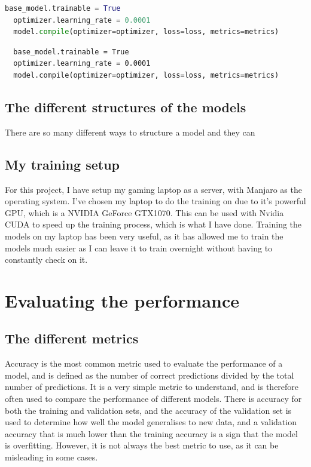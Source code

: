\documentclass[]{final_report}
\begin{document}
\begin{lstlisting}[language=Python]
  base_model.trainable = True
  optimizer.learning_rate = 0.0001
  model.compile(optimizer=optimizer, loss=loss, metrics=metrics)
\end{lstlisting}

\begin{verbatim}
  base_model.trainable = True
  optimizer.learning_rate = 0.0001
  model.compile(optimizer=optimizer, loss=loss, metrics=metrics)
\end{verbatim}

\section{The different structures of the models}
There are so many different ways to structure a model and they can 

\section{My training setup}
For this project, I have setup my gaming laptop as a server, with Manjaro\cite{Manjaro} as the operating system.
I've chosen my laptop to do the training on due to it's powerful GPU, which is a NVIDIA GeForce GTX1070\cite{GTX1070}.
This can be used with Nvidia CUDA\cite{CUDA} to speed up the training process, which is what I have done.
Training the models on my laptop has been very useful, as it has allowed me to train the models much easier 
as I can leave it to train overnight without having to constantly check on it.

\chapter{Evaluating the performance}

\section{The different metrics}
Accuracy is the most common metric used to evaluate the performance of a model, and is defined as the number of correct predictions divided by the total number of predictions.
It is a very simple metric to understand, and is therefore often used to compare the performance of different models.
There is accuracy for both the training and validation sets, and the accuracy of the validation set is used to determine how well the model generalises to new data,
and a validation accuracy that is much lower than the training accuracy is a sign that the model is overfitting.
However, it is not always the best metric to use, as it can be misleading in some cases.
\end{document}
